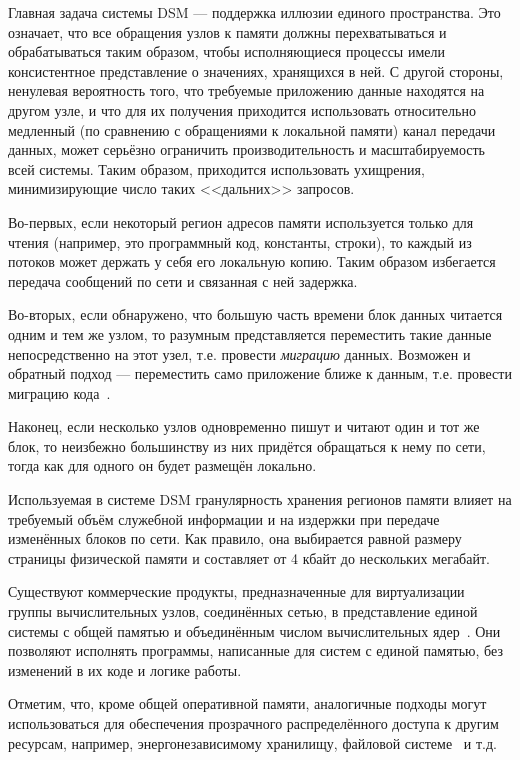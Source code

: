 \begin{itemize*}
    \item Главная задача системы DSM — поддержка иллюзии единого пространства. Это означает, что все обращения узлов к памяти должны перехватываться и обрабатываться таким образом, чтобы исполняющиеся процессы имели консистентное представление о значениях, хранящихся в ней. С другой стороны, ненулевая вероятность того, что требуемые приложению данные находятся на другом узле, и что для их получения приходится использовать относительно медленный (по сравнению с обращениями к локальной памяти) канал передачи данных, может серьёзно ограничить производительность и масштабируемость всей системы. Таким образом, приходится использовать ухищрения, минимизирующие число таких <<дальних>> запросов.
    \item Во-первых, если некоторый регион адресов памяти используется только для чтения (например, это программный код, константы, строки), то каждый из потоков может держать у себя его локальную копию. Таким образом избегается передача сообщений по сети и связанная с ней задержка.
    \item Во-вторых, если обнаружено, что большую часть времени блок данных читается одним и тем же узлом, то разумным представляется переместить такие данные непосредственно на этот узел, т.е. провести \textit{миграцию} данных. Возможен и обратный подход — переместить само приложение ближе к данным, т.е. провести миграцию кода~\cite{em2-migration}.
    \item Наконец, если несколько узлов одновременно пишут и читают один и тот же блок, то неизбежно большинству из них придётся  обращаться к нему по сети, тогда как для одного он будет размещён локально.
    \item Используемая в системе DSM гранулярность хранения регионов памяти влияет на требуемый объём служебной информации и на издержки при передаче изменённых блоков по сети. Как правило, она выбирается равной размеру страницы физической памяти и составляет от 4 кбайт до нескольких мегабайт.
\end{itemize*}

Существуют коммерческие продукты, предназначенные для виртуализации группы вычислительных узлов, соединённых сетью, в представление единой системы с общей памятью и объединённым числом вычислительных ядер~\cite{vsmp-foundation-free, sgi-uv}. Они позволяют исполнять программы, написанные для систем с единой памятью, без изменений в их коде и логике работы.

Отметим, что, кроме общей оперативной памяти,  аналогичные подходы могут использоваться для обеспечения прозрачного распределённого доступа к другим ресурсам, например, энергонезависимому хранилищу, файловой системе~\cite{gpfs2002, lustrefs} и т.д.

